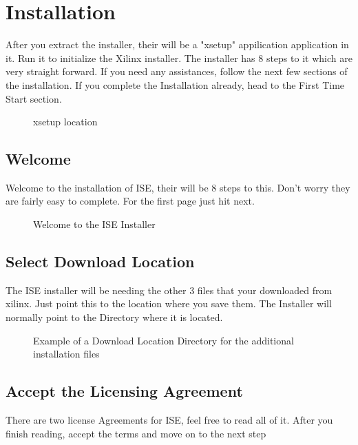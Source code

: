 \documentclass[letter]{article}
\begin{document}
\section{Installation}
After you extract the installer, their will be a "xsetup" appilication application in it. Run it to initialize the Xilinx installer. The installer has 8 steps to it which are very straight forward. If you need any assistances, follow the next few sections of the installation. If you complete the Installation already, head to the First Time Start section.

\begin{figure}[!htbp]
  \centering
  \caption{xsetup location}
\end{figure}

\subsection{Welcome}
Welcome to the installation of ISE, their will be 8 steps to this. Don't worry they are fairly easy to complete. For the first page just hit next.

\begin{figure}[!htbp]
  \centering
  \caption{Welcome to the ISE Installer}
\end{figure}

\subsection{Select Download Location}
The ISE installer will be needing the other 3 files that your downloaded from xilinx. Just point this to the location where you save them. The Installer will normally point to the Directory where it is located.

\begin{figure}[!htbp]
  \centering
  \caption{Example of a Download Location Directory for the additional installation files}
\end{figure}

\subsection{Accept the Licensing Agreement}
There are two license Agreements for ISE, feel free to read all of it. After you finish reading, accept the terms and move on to the next step
\end{document}
